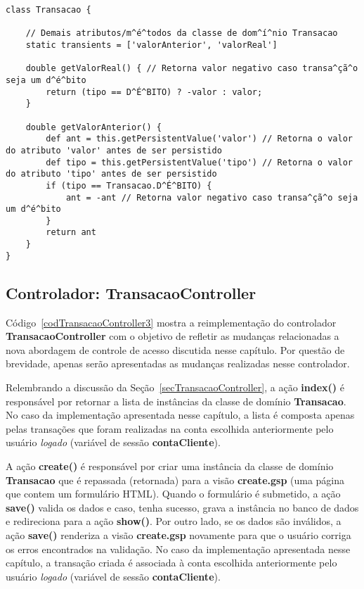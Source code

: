 \begin{lstlisting}[caption=Classe  de  domínio {\bf  Transacao},  frame =  trBL,
    float=htbp, label=codTransacao2] 
class Transacao {
    
    // Demais atributos/m^é^todos da classe de dom^í^nio Transacao
    static transients = ['valorAnterior', 'valorReal']
    
    double getValorReal() { // Retorna valor negativo caso transa^çã^o seja um d^é^bito
        return (tipo == D^É^BITO) ? -valor : valor;
    }
    
    double getValorAnterior() {
        def ant = this.getPersistentValue('valor') // Retorna o valor do atributo 'valor' antes de ser persistido
        def tipo = this.getPersistentValue('tipo') // Retorna o valor do atributo 'tipo' antes de ser persistido
        if (tipo == Transacao.D^É^BITO) {
            ant = -ant // Retorna valor negativo caso transa^çã^o seja um d^é^bito
        }
        return ant
    } 
}
\end{lstlisting}

\subsection{Controlador: TransacaoController}\label{secTransacaoController2}

\vspace{0.2cm}

Código~\ref{codTransacaoController3}  mostra  a  reimplementação do  controlador
{\bf TransacaoController} com o objetivo  de refletir as mudanças relacionadas a
nova abordagem de  controle de acesso discutida nesse  capítulo.  Por questão de
brevidade, apenas serão apresentadas as mudanças realizadas nesse controlador.  

Relembrando  a  discussão  da  Seção~\ref{secTransacaoController}, a  ação  {\bf
  index()} é responsável por retornar a lista de instâncias da classe de domínio
{\bf Transacao}.  No caso da implementação apresentada nesse capítulo, a lista é
composta  apenas  pelas  transações  que  foram realizadas  na  conta  escolhida
anteriormente pelo usuário {\it logado} (variável de sessão {\bf contaCliente}).  

A ação {\bf create()} é responsável por criar uma instância da classe de domínio
{\bf Transacao} que  é repassada (retornada) para a  visão {\bf create.gsp} (uma
página que contem  um formulário HTML). Quando o formulário  é submetido, a ação
{\bf save()} valida  os dados e caso, tenha sucesso, grava  a instância no banco
de dados e  redireciona para a ação  {\bf show()}.  Por outro lado,  se os dados
são inválidos, a ação {\bf  save()} renderiza a visão {\bf create.gsp} novamente
para  que o  usuário  corriga os  erros  encontrados na  validação.  No caso  da
implementação apresentada nesse capítulo, a transação criada é associada à conta
escolhida  anteriormente pelo  usuário  {\it logado}  (variável  de sessão  {\bf
  contaCliente}).  

